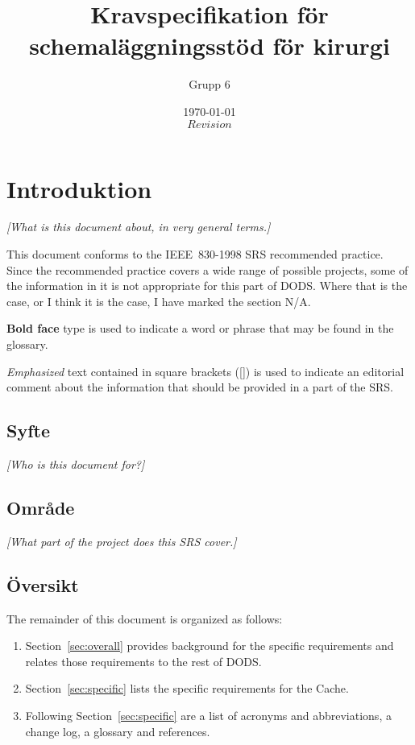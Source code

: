 \documentclass{article}
\begin{document}
\title{Kravspecifikation för schemaläggningsstöd för kirurgi}
\author{Grupp 6}
\date{\today \\ $Revision$ }



\maketitle
\tableofcontents


\section{Introduktion}
\emph{[What is this document about, in very general terms.]}

This document conforms to the IEEE~830-1998 \ac{SRS} recommended practice.
Since the recommended practice covers a wide range of possible projects, some
of the information in it is not appropriate for this part of \acs{DODS}.
Where that is the case, or I think it is the case, I have marked the section
N/A.

\textbf{Bold face} type is used to indicate a word or phrase that may be
found in the glossary.

\emph{Emphasized} text contained in square brackets ([]) is used to indicate
an editorial comment about the information that should be provided in a part
of the \ac{SRS}.

\subsection{Syfte}
\emph{[Who is this document for?]}

\subsection{Område}
\emph{[What part of the project does this SRS cover.]}

\subsection{Översikt}

The remainder of this document is organized as follows:
\begin{enumerate}
\item Section~\ref{sec:overall} provides background for the specific
requirements and relates those requirements to the rest of DODS.
\item Section~\ref{sec:specific} lists the specific requirements for the
  Cache.
\item Following Section~\ref{sec:specific} are a list of acronyms and
  abbreviations, a change log, a glossary and references.
\end{enumerate}
\end{document}
